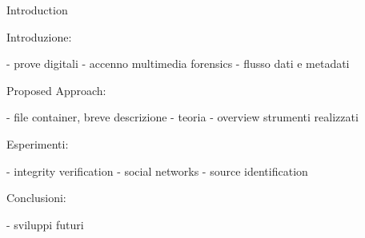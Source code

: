 

\begin{tframe}{Introduction}


Introduzione:

- prove digitali
- accenno multimedia forensics
- flusso dati e metadati

Proposed Approach:

- file container, breve descrizione
- teoria
- overview strumenti realizzati

Esperimenti:

- integrity verification
- social networks
- source identification

Conclusioni:

- sviluppi futuri


\end{tframe}

